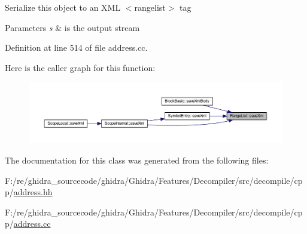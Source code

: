 Serialize this object to an X\+ML $<$rangelist$>$ tag 
\begin{DoxyParams}{Parameters}
{\em s} & is the output stream \\
\hline
\end{DoxyParams}


Definition at line 514 of file address.\+cc.

Here is the caller graph for this function\+:
\nopagebreak
\begin{figure}[H]
\begin{center}
\leavevmode
\includegraphics[width=350pt]{class_range_list_a026dc31507600a1c8786b1d201f7a19e_icgraph}
\end{center}
\end{figure}


The documentation for this class was generated from the following files\+:\begin{DoxyCompactItemize}
\item 
F\+:/re/ghidra\+\_\+sourcecode/ghidra/\+Ghidra/\+Features/\+Decompiler/src/decompile/cpp/\mbox{\hyperlink{address_8hh}{address.\+hh}}\item 
F\+:/re/ghidra\+\_\+sourcecode/ghidra/\+Ghidra/\+Features/\+Decompiler/src/decompile/cpp/\mbox{\hyperlink{address_8cc}{address.\+cc}}\end{DoxyCompactItemize}
